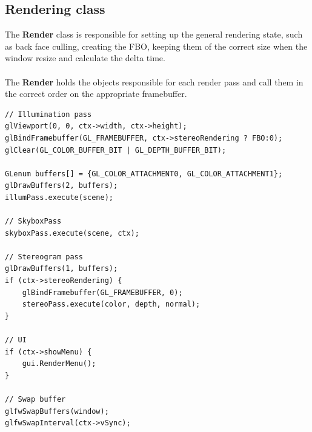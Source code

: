 \documentclass[12pt, a4paper]{article}
\begin{document}
\subsection{Rendering class}
The \textbf{Render} class is responsible for setting up the general rendering state, such as back face culling, creating
the FBO, keeping them of the correct size when the window resize and calculate the delta time.\\\\
The \textbf{Render} holds the objects responsible for each render pass and call them in the correct order on the appropriate
framebuffer.
\begin{lstlisting}[caption={Main rendering loop},captionpos=b]
// Illumination pass
glViewport(0, 0, ctx->width, ctx->height);
glBindFramebuffer(GL_FRAMEBUFFER, ctx->stereoRendering ? FBO:0);
glClear(GL_COLOR_BUFFER_BIT | GL_DEPTH_BUFFER_BIT);

GLenum buffers[] = {GL_COLOR_ATTACHMENT0, GL_COLOR_ATTACHMENT1};
glDrawBuffers(2, buffers);
illumPass.execute(scene);

// SkyboxPass
skyboxPass.execute(scene, ctx);

// Stereogram pass
glDrawBuffers(1, buffers);
if (ctx->stereoRendering) {
    glBindFramebuffer(GL_FRAMEBUFFER, 0);
    stereoPass.execute(color, depth, normal);
}

// UI
if (ctx->showMenu) {
    gui.RenderMenu();
}

// Swap buffer
glfwSwapBuffers(window);
glfwSwapInterval(ctx->vSync);
\end{lstlisting}
\end{document}
